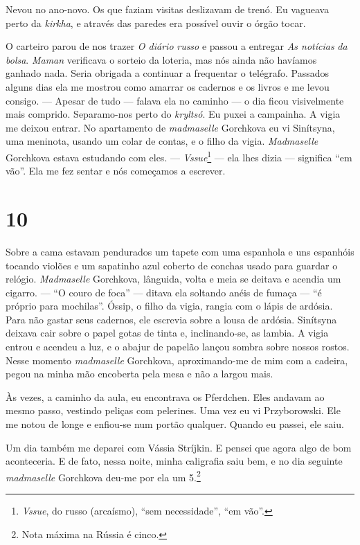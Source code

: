 Nevou no ano-novo. Os que faziam visitas deslizavam de trenó. Eu
vagueava perto da \emph{kirkha}, e através das paredes era possível
ouvir o órgão tocar.

O carteiro parou de nos trazer \emph{O diário} \emph{russo} e passou a
entregar \emph{As notícias} \emph{da bolsa}. \emph{Maman} verificava o
sorteio da loteria, mas nós ainda não havíamos ganhado nada. Seria
obrigada a continuar a frequentar o telégrafo. Passados alguns dias ela
me mostrou como amarrar os cadernos e os livros e me levou consigo. ---
Apesar de tudo --- falava ela no caminho --- o dia ficou visivelmente
mais comprido. Separamo-nos perto do \emph{kryltsó}. Eu puxei a
campainha. A vigia me deixou entrar. No apartamento de \emph{madmaselle}
Gorchkova eu vi Sinítsyna, uma meninota, usando um colar de contas, e o
filho da vigia. \emph{Madmaselle} Gorchkova estava estudando com eles.
--- \emph{Vssue}\footnote{\emph{Vssue}, do russo (arcaísmo), ``sem
  necessidade'', ``em vão''.} --- ela lhes dizia --- significa ``em
vão''. Ela me fez sentar e nós começamos a escrever.

\section{10}

Sobre a cama estavam pendurados um tapete com uma espanhola e uns
espanhóis tocando violões e um sapatinho azul coberto de conchas usado
para guardar o relógio. \emph{Madmaselle} Gorchkova, lânguida, volta e
meia se deitava e acendia um cigarro. --- ``O couro de foca'' --- ditava
ela soltando anéis de fumaça --- ``é próprio para mochilas''. Óssip, o
filho da vigia, rangia com o lápis de ardósia. Para não gastar seus
cadernos, ele escrevia sobre a lousa de ardósia. Sinítsyna deixava cair
sobre o papel gotas de tinta e, inclinando-se, as lambia. A vigia entrou
e acendeu a luz, e o abajur de papelão lançou sombra sobre nossos
rostos. Nesse momento \emph{madmaselle} Gorchkova, aproximando-me de mim
com a cadeira, pegou na minha mão encoberta pela mesa e não a largou
mais.

Às vezes, a caminho da aula, eu encontrava os Pferdchen. Eles andavam ao
mesmo passo, vestindo peliças com pelerines. Uma vez eu vi Przyborowski.
Ele me notou de longe e enfiou-se num portão qualquer. Quando eu passei,
ele saiu.

Um dia também me deparei com Vássia Stríjkin. E pensei que agora algo de
bom aconteceria. E de fato, nessa noite, minha caligrafia saiu bem, e no
dia seguinte \emph{madmaselle} Gorchkova deu-me por ela um 5.\footnote{Nota
  máxima na Rússia é cinco.}

